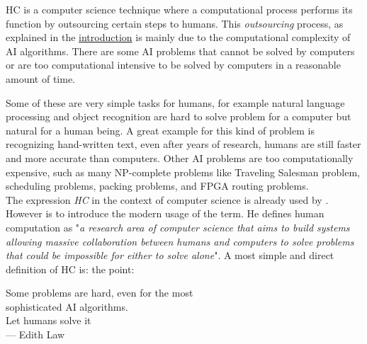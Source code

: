 
\acf{HC} is a computer science technique where a computational process
performs its function by outsourcing certain steps to humans. This
\emph{outsourcing} process, as explained in the \hyperref[intro]{introduction}
is mainly due to the computational complexity of \ac{AI} algorithms. There are
some \ac{AI} problems that cannot be solved by computers or are too computational
intensive to be solved by computers in a reasonable amount of time.

Some of these are very simple tasks for humans, for example natural language
processing and object recognition are hard to solve problem for a computer
but natural for a human being. A great example for this kind of problem
is recognizing hand-written text, even after years of research,
humans are still faster and more accurate than computers. Other \ac{AI} problems
are too computationally expensive, such as many NP-complete problems like
Traveling Salesman problem, scheduling problems, packing problems, and FPGA
routing problems.\\

The expression \emph{\acf{HC}} in the context of computer science is already
used by \cite{cogprints499}. However is \cite{human:comp} to introduce the modern
usage of the term. He defines human computation as "\emph{a research area of
computer science that aims to build systems allowing massive collaboration between
humans and computers to solve problems that could be impossible for either to
solve alone}". A most simple and direct definition of \ac{HC} is:
the point:
\begin{quoting}\flushright
	Some problems are hard, even for the most\\
	sophisticated AI algorithms.\\
	Let humans solve it\omissis\\
	\medskip
    {\rm --- Edith Law}
\end{quoting}




